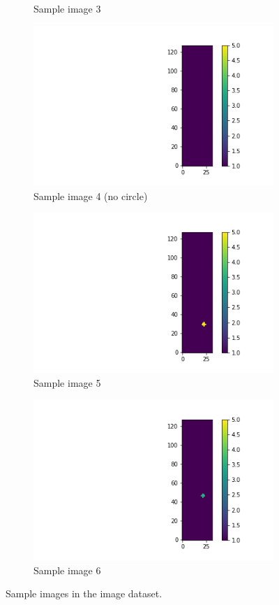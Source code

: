 \documentclass{article}
\begin{document}
\begin{figure}
\begin{subfigure}[b]{0.45\textwidth}
    \caption{Sample image 3}
  \end{subfigure}
  \begin{subfigure}[b]{0.45\textwidth}
    \centering
    \includegraphics[totalheight=4cm]{circle_id/sample3.png}
    \caption{Sample image 4 (no circle)}
  \end{subfigure}
  \begin{subfigure}[b]{0.45\textwidth}
    \centering
    \includegraphics[totalheight=4cm]{circle_id/sample4.png}
    \caption{Sample image 5}
  \end{subfigure}
  \begin{subfigure}[b]{0.45\textwidth}
    \centering
    \includegraphics[totalheight=4cm]{circle_id/sample5.png}
    \caption{Sample image 6}
  \end{subfigure}
\caption{\label{fig:sampleimages} Sample images in the image dataset.}
\end{figure}
%
\end{document}
